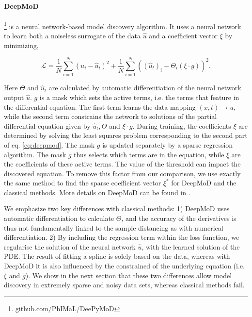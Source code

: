 \documentclass{article} %
\begin{document}
\paragraph{DeepMoD} \cite{both2019,both2020}\footnote{github.com/PhIMaL/DeePyMoD} is a neural network-based model discovery algorithm. It uses a neural network to learn both a noiseless surrogate of the data $\hat{u}$ and a coefficient vector $\xi$ by minimizing,

\begin{equation}
\mathcal{L} = \frac{1}{N}\sum_{i=1}^{N}\left( u_i - \hat{u}_i \right) ^2 +\frac{1}{N}\sum_{i=1}^{N}\left( (\hat{u}_t)_i - \Theta_{i}(\xi \cdot g)\right)^2.
\label{eq:deepmod}
\end{equation}

Here $\Theta$ and $\hat{u}_t$ are calculated by automatic differentiation of the neural network output $\hat{u}$. $g$ is a mask which sets the active terms, i.e. the terms that feature in the differential equation. The first term learns the data mapping $(x, t) \to \hat{u}$, while the second term constrains the network to solutions of the partial differential equation given by $\hat{u}_t, \Theta$ and $\xi \cdot g$. During training, the coefficients $\xi$ are determined by solving the least squares problem corresponding to the second part of eq. \ref{eq:deepmod}. The mask $g$ is updated separately by a sparse regression algorithm. The mask $g$ thus selects which terms are in the equation, while $\xi$ are the coefficients of these active terms. The value of the threshold can impact the discovered equation. To remove this factor from our comparison, we use exactly the same method to find the sparse coefficient vector $\xi^*$ for DeepMoD and the classical methods. More details on DeepMoD can be found in \cite{both2019,both2020}.


We emphasize two key differences with classical methods: 1) DeepMoD uses automatic differentiation to calculate $\Theta$, and the accuracy of the derivatives is thus not fundamentally linked to the sample distancing as with numerical differentiation. 2) By including the regression term within the loss function, we regularise the solution of the neural network $\hat{u}$, with the learned solution of the PDE. The result of fitting a spline is solely based on the data, whereas with DeepMoD it is also influenced by the constrained of the underlying equation (i.e. $\xi$ and $g$). We show in the next section that these two differences allow model discovery in extremely sparse and noisy data sets, whereas classical methods fail.
\end{document}
